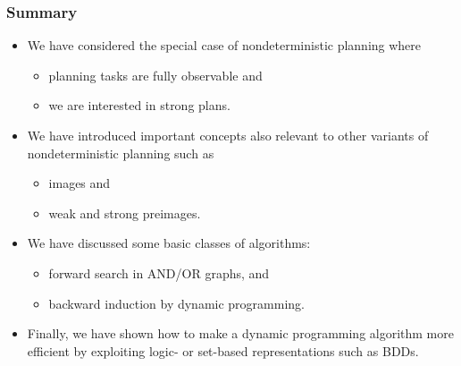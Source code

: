 \documentclass{gkibeamer}
\begin{document}
\begin{frame}
  \frametitle{Summary}

  \begin{itemize}
  \item We have considered the special case of nondeterministic planning
    where
    \begin{itemize}
    \item planning tasks are \alert{fully observable} and
    \item we are interested in \alert{strong plans}.
    \end{itemize}
  \item We have introduced important concepts also relevant
    to other variants of nondeterministic planning such as
    \begin{itemize}
    \item \alert{images} and
    \item \alert{weak and strong preimages}.
    \end{itemize}
  \item We have discussed some basic classes of algorithms:
    \begin{itemize}
    \item \alert{forward search} in AND/OR graphs, and
    \item \alert{backward induction} by dynamic programming.
    \end{itemize}
  \item Finally, we have shown how to make a dynamic programming
    algorithm more efficient by exploiting logic- or set-based
    representations such as BDDs.
  \end{itemize}
\end{frame}
\end{document}
